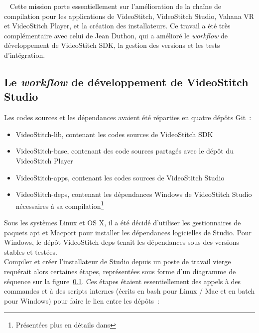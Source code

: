 \ \newline
Cette mission porte essentiellement sur l'amélioration de la chaîne de compilation
pour les applications de VideoStitch, VideoStitch Studio, Vahana VR et VideoStitch
Player, et la création des installateurs. Ce travail a été très complémentaire avec
celui de Jean Duthon, qui a amélioré le \textit{workflow} de développement de VideoStitch SDK,
la gestion des versions et les tests d'intégration.

\subsection{Le \textit{workflow} de développement de VideoStitch Studio}
\label{workflow-studio}
Les codes sources et les dépendances avaient été réparties en quatre dépôts Git~: 
\begin{itemize}
  \item VideoStitch-lib, contenant les codes sources de VideoStitch SDK
  \item VideoStitch-base, contenant des code sources partagés avec le dépôt du VideoStitch Player
  \item VideoStitch-apps, contenant les codes sources de VideoStitch Studio
  \item VideoStitch-deps, contenant les dépendances Windows de VideoStitch Studio 
  nécessaires à sa compilation\footnote{Présentées plus en détails dans }
\end{itemize}
Sous les systèmes Linux et OS X, il a été décidé d'utiliser les gestionnaires
de paquets apt et Macport pour installer les dépendances logicielles de Studio. Pour
Windows, le dépôt VideoStitch-deps tenait les dépendances sous des versions stables et testées.\\
\newline
Compiler et créer l'installateur de Studio depuis un poste de travail vierge requérait alors
certaines étapes, représentées sous forme d'un diagramme de séquence sur la figure~\ref{workflow-studio}.
Ces étapes étaient essentiellement des appels à des commandes et à des scripts internes
(écrits en bash pour Linux / Mac et en batch pour Windows) pour faire le lien entre les dépôts~:
